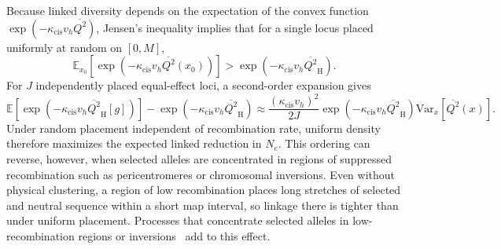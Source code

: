 \documentclass{article}
\begin{document}
Because linked diversity depends on the expectation of the convex function $\exp(-\kappa_\text{cis} v_h \overline{Q^2})$, Jensen's inequality implies that for a single locus placed uniformly at random on $[0, M]$,
\begin{equation}
    \mathbb{E}_{x_0}\!\left[\exp\!\left(-\kappa_\text{cis} v_h \overline{Q^2}(x_0)\right)\right] > \exp\!\left(-\kappa_\text{cis} v_h \overline{Q^2}_\text{H}\right).
\end{equation}
For $J$ independently placed equal-effect loci, a second-order expansion gives
\begin{equation}
    \mathbb{E}\!\left[\exp\!\left(-\kappa_\text{cis} v_h \overline{Q^2}_\text{H}[g]\right)\right] - \exp\!\left(-\kappa_\text{cis} v_h \overline{Q^2}_\text{H}\right) \approx \frac{(\kappa_\text{cis} v_h)^2}{2J}\exp\!\left(-\kappa_\text{cis} v_h \overline{Q^2}_\text{H}\right)\mathrm{Var}_x\!\left[\overline{Q^2}(x)\right].
\end{equation}
Under random placement independent of recombination rate, uniform density therefore maximizes the expected linked reduction in $N_e$. This ordering can reverse, however, when selected alleles are concentrated in regions of suppressed recombination such as pericentromeres or chromosomal inversions. Even without physical clustering, a region of low recombination places long stretches of selected and neutral sequence within a short map interval, so linkage there is tighter than under uniform placement. Processes that concentrate selected alleles in low-recombination regions or inversions~\cite{kirkpatrick2006,yeaman2013} add to this effect.

\ifdefined\isMainDocument
\else
    \printbibliography
    
\end{document}
